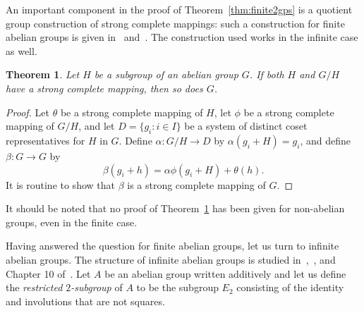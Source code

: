 \documentclass[12pt,a4paper]{article}
\newtheorem{thm}{Theorem}[section]
\begin{document}
An important component in the proof of Theorem~\ref{thm:finite2gps} is a quotient group construction of strong complete mappings: such a construction for finite abelian groups is given in~\cite{Evans:1990} and~\cite{Horton:1990}. The construction used works in the infinite case as well.

\begin{thm}\label{thm:G/H}
Let $H$ be a subgroup of an abelian group $G$. If both $H$ and $G/H$ have a strong complete mapping, then so does $G$.
\end{thm}
\begin{proof}
Let $\theta$ be a strong complete mapping of $H$, let $\phi$ be a strong complete mapping of $G/H$, and let $D=\{g_i : i\in I\}$ be a system of distinct coset representatives for $H$ in $G$. Define $\alpha\colon G/H\to D$ by $\alpha(g_i+H)=g_i$, and define $\beta\colon G\to G$ by 
\[
\beta(g_i+h)=\alpha\phi(g_i+H)+\theta(h).
\]
It is routine to show that $\beta$ is a strong complete mapping of $G$.
\end{proof}

It should be noted that no proof of Theorem~\ref{thm:G/H} has been given for non-abelian groups, even in the finite case.


Having answered the question for finite abelian groups, let us turn to infinite abelian groups. The structure of infinite abelian groups is studied in~\cite{Fuchs:2015},~\cite{Kaplansky:1969}, and Chapter 10 of~\cite{Rotman:1995}. Let $A$ be an abelian group written additively and let us define the {\em restricted $2$-subgroup} of $A$ to be the subgroup $E_2$ consisting of the identity and involutions that are not squares. 
\end{document}
